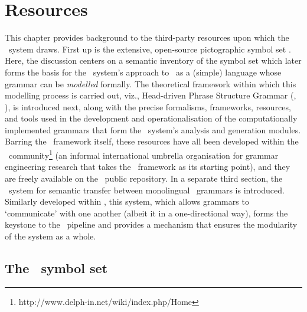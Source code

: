 
\chapter{Resources}
\label{chap:Background}

This chapter provides background to the third-party resources upon which the
\depicto\ system draws. First up is the extensive, open-source pictographic
symbol set \sclera. Here, the discussion centers on a semantic inventory of the
symbol set which later forms the basis for the \depicto\ system's approach to
\sclera\ as a (simple) language whose grammar can be \emph{modelled} formally.
The theoretical framework within which this modelling process is carried out,
viz., Head-driven Phrase Structure Grammar (\hpsg, \citet{pollard1994head}), is
introduced next, along with the precise formalisms, frameworks, resources, and
tools used in the development and operationalisation of the computationally
implemented grammars that form the \depicto\ system's analysis and generation
modules. Barring the \hpsg\ framework itself, these resources have all been
developed within the \delphin\
community\footnote{http://www.delph-in.net/wiki/index.php/Home} (an informal
international umbrella organisation for grammar engineering research that takes
the \hpsg\ framework as its starting point), and they are freely available on
the \delphin\ public repository. In a separate third section, the \logon\
system for semantic transfer between monolingual \delphin\ grammars is
introduced. Similarly developed within \delphin, this system, which allows
grammars to `communicate' with one another (albeit it in a one-directional
way), forms the keystone to the \depicto\ pipeline and provides a mechanism
that ensures the modularity of the system as a whole.

\section{The \sclera\ symbol set}
\label{sec:sclera}

